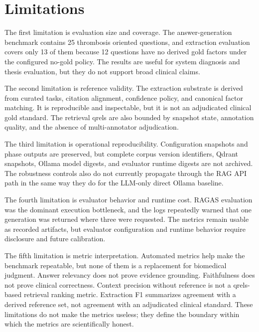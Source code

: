 \section{Limitations}

The first limitation is evaluation size and coverage. The answer-generation benchmark contains 25 thrombosis oriented questions, and extraction evaluation covers only 13 of them because 12 questions have no derived gold factors under the configured no-gold policy. The results are useful for system diagnosis and thesis evaluation, but they do not support broad clinical claims.

The second limitation is reference validity. The extraction substrate is derived from curated tasks, citation alignment, confidence policy, and canonical factor matching. It is reproducible and inspectable, but it is not an adjudicated clinical gold standard. The retrieval qrels are also bounded by snapshot state, annotation quality, and the absence of multi-annotator adjudication.

The third limitation is operational reproducibility. Configuration snapshots and phase outputs are preserved, but complete corpus version identifiers, Qdrant snapshots, Ollama model digests, and evaluator runtime digests are not archived. The robustness controls also do not currently propagate through the RAG API path in the same way they do for the LLM-only direct Ollama baseline.

The fourth limitation is evaluator behavior and runtime cost. RAGAS evaluation was the dominant execution bottleneck, and the logs repeatedly warned that one generation was returned where three were requested. The metrics remain usable as recorded artifacts, but evaluator configuration and runtime behavior require disclosure and future calibration.

The fifth limitation is metric interpretation. Automated metrics help make the benchmark repeatable, but none of them is a replacement for biomedical judgment. Answer relevancy does not prove evidence grounding. Faithfulness does not prove clinical correctness. Context precision without reference is not a qrels-based retrieval ranking metric. Extraction F1 summarizes agreement with a derived reference set, not agreement with an adjudicated clinical standard. These limitations do not make the metrics useless; they define the boundary within which the metrics are scientifically honest.

